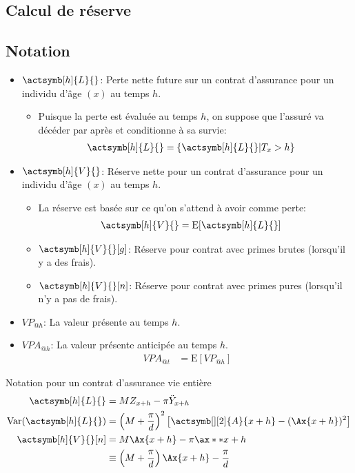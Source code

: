 \documentclass[10pt, french]{article}
\begin{document}
\begin{multicols*}{2}
\pagebreak

\section{Calcul de réserve}

\subsection*{Notation}
\begin{itemize}[leftmargin = *]
	\item[] 	$\actsymb[h]{L}{}$: Perte nette future sur un contrat d'assurance pour un individu d'âge $(x)$ au temps $h$.
		\begin{itemize}[leftmargin = *]
		\item	Puisque la perte est évaluée au temps $h$, on suppose que l'assuré va décéder par après et conditionne à sa survie:
			\begin{align*}
			\actsymb[h]{L}{}	
			&=	\{ \actsymb[h]{L}{} | T_{x} > h \}
			\end{align*}
		\end{itemize}
	\item[]	$\actsymb[h]{V}{}$: Réserve nette pour un contrat d'assurance pour un individu d'âge $(x)$ au temps $h$.
		\begin{itemize}[leftmargin = *]
		\item	La réserve est basée sur ce qu'on s'attend à avoir comme perte:
			\begin{align*}
			\actsymb[h]{V}{}	
			&=	\text{E}[\actsymb[h]{L}{}]	
			\end{align*}
		\item[]	$\actsymb[h]{V}{}[g]$: Réserve pour contrat avec primes brutes (lorsqu'il y a des frais).
		\item[]	$\actsymb[h]{V}{}[n]$: Réserve pour contrat avec primes pures (lorsqu'il n'y a pas de frais).
		\end{itemize}
	\item[]	$VP_{@h}$: La valeur présente au temps $h$.
	\item[]	$VPA_{@h}$: La valeur présente anticipée au temps $h$.
		\begin{align*}
		VPA_{@t}	
		&=	\text{E}[VP_{@h}]
		\end{align*}
\end{itemize}

\begin{examplebox}{Notation pour un contrat d'assurance vie entière}
\begin{align*}
	\actsymb[h]{L}{}	
	&=	M Z_{x + h} - \pi \ddot{Y}_{x + h}	\\
	\text{Var}(\actsymb[h]{L}{})
	&=	\left(M + \frac{\pi}{d}\right)^{2} \left[ \actsymb[][2]{A}{x + h} - (\Ax{x + h})^{2} \right]	\\
	\actsymb[h]{V}{}[n]	
	&=	M \Ax{x + h} - \pi \ax**{x + h}	\\
	&\equiv	\left(M + \frac{\pi}{d}\right) \Ax{x + h} - \frac{\pi}{d}
\end{align*}


\end{examplebox}
\end{multicols*}
\end{document}

